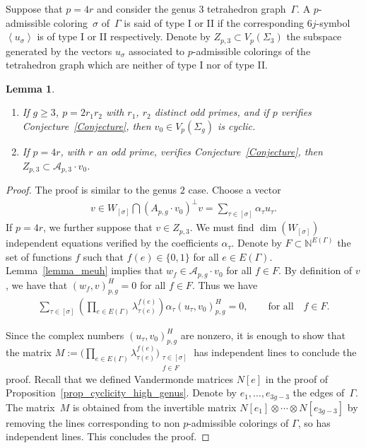 \documentclass[pdftex]{sigma}
\numberwithin{equation}{section}
\newtheorem{Lemma}[Theorem]{Lemma}
\begin{document}
Suppose that $p=4r$ and consider the genus $3$ tetrahedron graph~$\Gamma$. A $p$-admissible coloring~$\sigma$ of~$\Gamma$ is said of type I or II if the corresponding $6j$-symbol $\left< u_{\sigma}\right>$ is of type I or II respectively. Denote by $Z_{p,3}\subset V_p(\Sigma_3)$ the subspace generated by the vectors $u_{\sigma}$ associated to $p$-admissible colorings of the tetrahedron graph which are neither of type I nor of type II.
\begin{Lemma}\label{lemma_ultimate}\quad
\begin{enumerate}\itemsep=0pt
\item[$1.$] If $g\geq 3$, $p=2r_1r_2$ with $r_1$, $r_2$ distinct odd primes, and if $p$ verifies Conjecture~{\rm \ref{Conjecture}}, then $v_0\in V_p(\Sigma_g)$ is cyclic.
\item[$2.$] If $p=4r$, with $r$ an odd prime, verifies Conjecture~{\rm \ref{Conjecture}}, then $Z_{p,3}\subset \mathcal{A}_{p,3}\cdot v_0$.
\end{enumerate}
\end{Lemma}

\begin{proof} The proof is similar to the genus $2$ case. Choose a vector
\begin{gather*}
v \in W_{[\sigma]}\bigcap ( A_{p,g}\cdot v_0)^{\bot} v = \sum_{\tau\in [\sigma]}{\alpha_{\tau}u_{\tau}}.
\end{gather*}
If $p=4r$, we further suppose that $v\in Z_{p,3}$. We must find $\dim \left(W_{[\sigma]}\right)$ independent equations verified by the coefficients $\alpha_{\tau}$. Denote by $F\subset \mathbb{N}^{E(\Gamma)}$ the set of functions $f$ such that $f(e) \in \{0,1\}$ for all $e\in E(\Gamma)$. Lemma~\ref{lemma_meuh} implies that $w_f\in \mathcal{A}_{p,g}\cdot v_0$ for all $ f\in F$. By definition of $v$, we have that $\left(w_f, v \right)_{p,g}^H = 0$ for all $f\in F$. Thus we have
\begin{gather*}\label{eq_cyclicity}
 \sum_{\tau\in [\sigma]}{\left( \prod_{e\in E(\Gamma)}{\lambda_{\tau(e)}^{f(e)}}\right) \alpha_{\tau} ( u_{\tau}, v_0 )_{p,g}^H } =0, \qquad \text{for all} \quad f\in F.
\end{gather*}

Since the complex numbers $ ( u_{\tau}, v_0 )_{p,g}^H$ are nonzero, it is enough to show that the matrix $M := \Big(\prod\limits_{e\in E(\Gamma)}{\lambda_{\tau(e)}^{f(e)}}\Big)_{\substack{\tau\in[\sigma] \\ f\in F}} $ has independent lines to conclude the proof. Recall that we defined Vandermonde matrices $N[e]$ in the proof of Proposition~\ref{prop_cyclicity_high_genus}. Denote by $e_1, \ldots, e_{3g-3}$ the edges of~$\Gamma$. The matrix~$M$ is obtained from the invertible matrix $ N[e_1]\otimes \cdots \otimes N[e_{3g-3}]$ by removing the lines corresponding to non $p$-admissible colorings of $\Gamma$, so has independent lines. This concludes the proof.
\end{proof}
\end{document}
